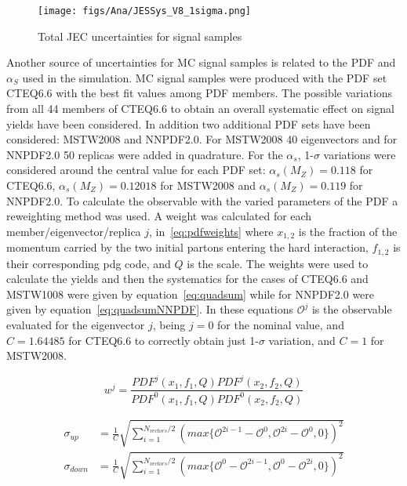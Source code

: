 \begin{figure}[!Hhtbp]
  \begin{center}
    \texttt{[image: figs/Ana/JESSys\_V8\_1sigma.png]}
    \caption{Total JEC uncertainties for signal samples}
    \label{fig:TotalJECSys}
  \end{center}
\end{figure}

Another source of uncertainties for MC signal samples is related to the PDF and $\alpha_{S}$ used in the simulation. MC signal samples were produced with the PDF set CTEQ6.6 with the best fit values among PDF members. The possible variations from all 44 members of CTEQ6.6 to obtain an overall systematic effect on signal yields have been considered. In addition two additional PDF sets have been considered: MSTW2008 and NNPDF2.0. For MSTW2008 40 eigenvectors and for NNPDF2.0 50 replicas were added in quadrature. For the $\alpha_{s}$, 1-$\sigma$ variations were considered around the central value for each PDF set: $\alpha_{s}(M_{Z})=0.118$ for CTEQ6.6, $\alpha_{s}(M_{Z})=0.12018$ for MSTW2008 and $\alpha_{s}(M_{Z})=0.119$ for NNPDF2.0. To calculate the observable with the varied parameters of the PDF a reweighting method was used. A weight was calculated for each member/eigenvector/replica $j$, in~\ref{eq:pdfweights} where $x_{1,2}$ is the fraction of the momentum carried by the two initial partons entering the hard interaction, $f_{1,2}$ is their corresponding pdg code, and $Q$ is the scale. The weights were used to calculate the yields and then the systematics for the cases of CTEQ6.6 and MSTW1008 were given by equation~\ref{eq:quadsum} while for NNPDF2.0 were given by equation~\ref{eq:quadsumNNPDF}. In these equations $\mathcal{O}^{j}$ is the observable evaluated for the eigenvector $j$, being $j=0$ for the nominal value, and $C=1.64485$ for CTEQ6.6 to correctly obtain just 1-$\sigma$ variation, and $C=1$ for MSTW2008.

\begin{equation} \label{eq:pdfweights}
w^{j}=\frac{PDF^{j}(x_{1},f_{1},Q)PDF^{j}(x_{2},f_{2},Q)}{PDF^{0}(x_{1},f_{1},Q)PDF^{0}(x_{2},f_{2},Q)}
\end{equation}

\begin{align} \label{eq:quadsum}
\sigma_{up} & = \frac{1}{C}\sqrt{\sum_{i=1}^{N_{vectors}/2}(max\{\mathcal{O}^{2i-1}-\mathcal{O}^{0},\mathcal{O}^{2i}-\mathcal{O}^{0},0\})^{2}} \nonumber\\
\sigma_{down} & = \frac{1}{C}\sqrt{\sum_{i=1}^{N_{vectors}/2}(max\{\mathcal{O}^{0}-\mathcal{O}^{2i-1},\mathcal{O}^{0}-\mathcal{O}^{2i},0\})^{2}}
\end{align}

